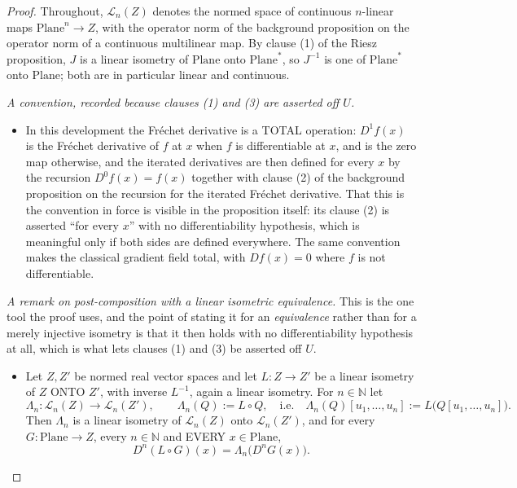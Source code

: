 \begin{proof}
Throughout, $\mathcal{L}_n(Z)$ denotes the normed space of continuous $n$-linear maps
$\mathrm{Plane}^{n}\to Z$, with the operator norm of the background proposition on the operator
norm of a continuous multilinear map.  By clause (1) of the Riesz proposition, $J$ is a linear
isometry of $\mathrm{Plane}$ onto $\mathrm{Plane}^{*}$, so $J^{-1}$ is one of
$\mathrm{Plane}^{*}$ onto $\mathrm{Plane}$; both are in particular linear and continuous.

\medskip\noindent\emph{A convention, recorded because clauses (1) and (3) are asserted off $U$.}
\begin{itemize}
\item[(C)] In this development the Fr\'echet derivative is a TOTAL operation: $D^{1}f(x)$ is the
Fr\'echet derivative of $f$ at $x$ when $f$ is differentiable at $x$, and is the zero map
otherwise, and the iterated derivatives are then defined for every $x$ by the recursion
$D^{0}f(x)=f(x)$ together with clause (2) of the background proposition on the recursion for the
iterated Fr\'echet derivative.  That this is the convention in force is visible in the
proposition itself: its clause (2) is asserted ``for every $x$'' with no differentiability
hypothesis, which is meaningful only if both sides are defined everywhere.  The same convention
makes the classical gradient field total, with $Df(x)=0$ where $f$ is not differentiable.
\end{itemize}

\medskip\noindent\emph{A remark on post-composition with a linear isometric equivalence.}
This is the one tool the proof uses, and the point of stating it for an \emph{equivalence} rather
than for a merely injective isometry is that it then holds with no differentiability hypothesis
at all, which is what lets clauses (1) and (3) be asserted off $U$.
\begin{itemize}
\item[(E)] Let $Z,Z'$ be normed real vector spaces and let $L\colon Z\to Z'$ be a linear
isometry of $Z$ ONTO $Z'$, with inverse $L^{-1}$, again a linear isometry.  For
$n\in\mathbb{N}$ let
\[
  \Lambda_n\colon\mathcal{L}_n(Z)\to\mathcal{L}_n(Z'),
  \qquad
  \Lambda_n(Q):=L\circ Q,
  \quad\text{i.e.}\quad
  \Lambda_n(Q)[u_1,\ldots,u_n]:=L\bigl(Q[u_1,\ldots,u_n]\bigr).
\]
Then $\Lambda_n$ is a linear isometry of $\mathcal{L}_n(Z)$ onto $\mathcal{L}_n(Z')$, and for
every $G\colon\mathrm{Plane}\to Z$, every $n\in\mathbb{N}$ and EVERY $x\in\mathrm{Plane}$,
\begin{equation}\label{eq:gfos-E}
  D^{n}(L\circ G)(x)=\Lambda_n\bigl(D^{n}G(x)\bigr).
\end{equation}


\end{itemize}
\end{proof}

